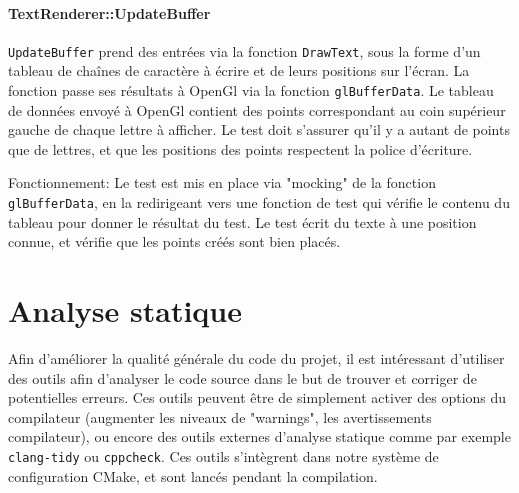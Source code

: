 

\paragraph{TextRenderer::UpdateBuffer}\label{textrendererupdatebuffer}

\texttt{UpdateBuffer} prend des entrées via la fonction
\texttt{DrawText}, sous la forme d'un tableau de chaînes de caractère à
écrire et de leurs positions sur l'écran. La fonction passe ses
résultats à OpenGl via la fonction \texttt{glBufferData}. Le tableau de
données envoyé à OpenGl contient des points correspondant au coin
supérieur gauche de chaque lettre à afficher. Le test doit s'assurer
qu'il y a autant de points que de lettres, et que les positions des
points respectent la police d'écriture.

Fonctionnement: Le test est mis en place via "mocking" de la fonction
\texttt{glBufferData}, en la redirigeant vers une fonction de test qui vérifie le
contenu du tableau pour donner le résultat du test. Le test écrit du
texte à une position connue, et vérifie que les points créés sont bien
placés.



\newpage
\section{Analyse statique}\label{sec:sanal}

Afin d'améliorer la qualité générale du code du projet, il est
intéressant d'utiliser des outils afin d'analyser le code source dans le
but de trouver et corriger de potentielles erreurs. Ces outils peuvent
être de simplement activer des options du compilateur (augmenter les
niveaux de "warnings", les avertissements compilateur), ou encore des
outils externes d'analyse statique comme par exemple \texttt{clang-tidy}
ou \texttt{cppcheck}. Ces outils s'intègrent dans notre système de
configuration CMake, et sont lancés pendant la compilation.

